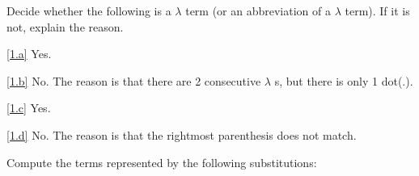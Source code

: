 \documentclass{homework}
\begin{document}
\begin{problem}
  Decide whether the following is a $\lambda$ term (or an abbreviation of a
  $\lambda$ term).
  If it is not, explain the reason.
\end{problem}

\begin{solution}

  \ref{1.a} %
  Yes.

  \ref{1.b} %
  No. The reason is that there are 2 consecutive $\lambda$ s,
  but there is only 1 dot(.).

  \ref{1.c}
  Yes.

  \ref{1.d}
  No. The reason is that the rightmost parenthesis does not match.

\end{solution}

\begin{problem}
  Compute the terms represented by the following substitutions:
\end{problem}
\end{document}
